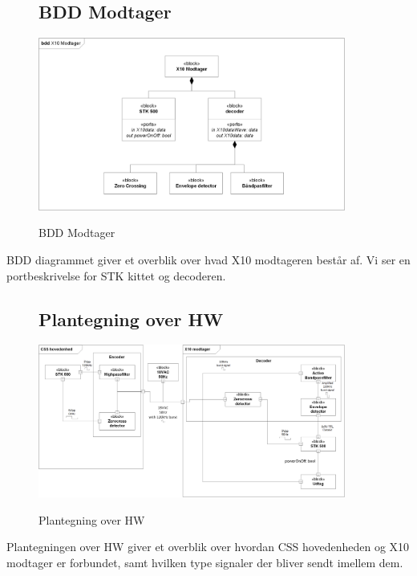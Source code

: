 \begin{figure}[!htbp] \centering
\subsection{BDD Modtager}
{\includegraphics[width=0.9\textwidth]{billeder/diagrammer/BDD_Modtager}}
\caption{BDD Modtager}
\label{lab:bddmodtager}
\raggedright
\end{figure}
BDD diagrammet giver et overblik over hvad X10 modtageren består af. Vi ser en portbeskrivelse for STK kittet og decoderen.

\begin{figure}[!htbp] \centering
\subsection{Plantegning over HW}
{\includegraphics[width=0.9\textwidth]{billeder/diagrammer/Plantegning_over_HW}}
\caption{Plantegning over HW}
\label{lab:Plantegning over HW}
\raggedright
\end{figure}
Plantegningen over HW giver et overblik over hvordan CSS hovedenheden og X10 modtager er forbundet, samt hvilken type signaler der bliver sendt imellem dem.


